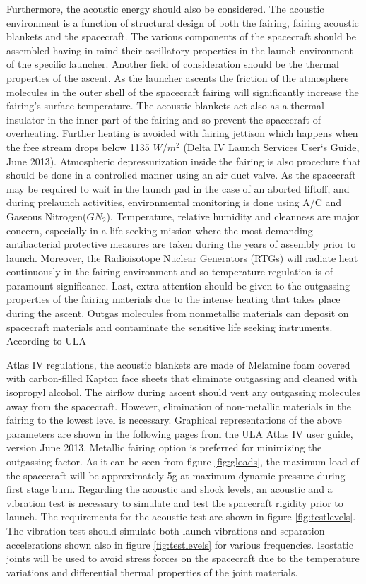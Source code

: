 Furthermore, the acoustic energy should also be considered. The acoustic environment is a function of structural design of both the fairing, fairing acoustic blankets and the spacecraft. The various components of the spacecraft should be assembled having in mind their oscillatory properties in the launch environment of the specific launcher. Another field of consideration should be the thermal properties of the ascent. As the launcher ascents the friction of the atmosphere molecules in the outer shell of the spacecraft fairing will significantly increase the fairing’s surface temperature. The acoustic blankets act also as a thermal insulator in the inner part of the fairing and so prevent the spacecraft of overheating. Further heating is avoided with fairing jettison which happens when the free stream drops below 1135 $W/m^2$ (Delta IV Launch Services User‘s Guide, June 2013).
Atmospheric depressurization inside the fairing is also procedure that should be done in a controlled manner using an air duct valve. As the spacecraft may be required to wait in the launch pad in the case of an aborted liftoff, and during prelaunch activities, environmental monitoring is done using A/C and Gaseous Nitrogen($GN_2$). Temperature, relative humidity and cleanness are major concern, especially in a life seeking mission where the most demanding antibacterial protective measures are taken during the years of assembly prior to launch. Moreover, the Radioisotope Nuclear Generators (RTGs) will radiate heat continuously in the fairing environment and so temperature regulation is of paramount significance. Last, extra attention should be given to the outgassing properties of the fairing materials due to the intense heating that takes place during the ascent. Outgas molecules from nonmetallic materials can deposit on spacecraft materials and contaminate the sensitive life seeking instruments. According to ULA

Atlas IV regulations, the acoustic blankets are made of Melamine foam covered with carbon-filled Kapton face sheets that eliminate outgassing and cleaned with isopropyl alcohol. The airflow during ascent should vent any outgassing molecules away from the spacecraft. However, elimination of non-metallic materials in the fairing to the lowest level is necessary. Graphical representations of the above parameters are shown in the following pages from the ULA Atlas IV user guide, version June 2013. Metallic fairing option is preferred for minimizing the outgassing factor. As it can be seen from figure \ref{fig:gloads}, the maximum load of the spacecraft will be approximately 5g at maximum dynamic pressure during first stage burn. Regarding the acoustic and shock levels, an acoustic and a vibration test is necessary to simulate and test the spacecraft rigidity prior to launch. The requirements for the acoustic test are shown in figure \ref{fig:testlevels}. The vibration test should simulate both launch vibrations and separation accelerations shown also in figure \ref{fig:testlevels} for various frequencies. Isostatic joints will be used to avoid stress forces on the spacecraft due to the temperature variations and differential thermal properties of the joint materials. 

